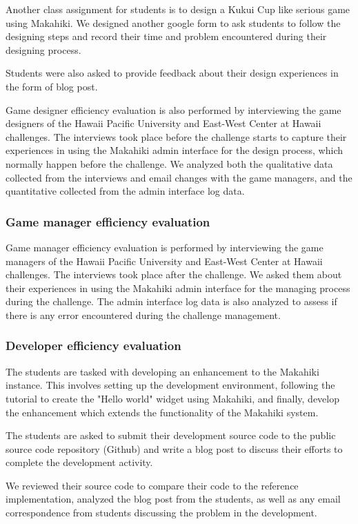 \documentclass{sigchi}
\begin{document}
Another class assignment for students is to design a Kukui Cup like serious game using Makahiki. We designed another google form to ask students to follow the designing steps and record their time and problem encountered during their designing process.

Students were also asked to provide feedback about their design experiences in the form of blog post.

Game designer efficiency evaluation is also performed by interviewing the game designers of the Hawaii Pacific University and East-West Center at Hawaii challenges. The interviews took place before the challenge starts to capture their experiences in using the Makahiki admin interface for the design process, which normally happen before the challenge. We analyzed both the qualitative data collected from the interviews and email changes with the game managers, and the quantitative collected from the admin interface log data.

\subsubsection{Game manager efficiency evaluation}
Game manager efficiency evaluation is performed by interviewing the game managers of the Hawaii Pacific University and East-West Center at Hawaii challenges. The interviews took place after the challenge. We asked them about their experiences in using the Makahiki admin interface for the managing process during the challenge. The admin interface log data is also analyzed to assess if there is any error encountered during the challenge management.

\subsubsection{Developer efficiency evaluation}

The students are tasked with developing an enhancement to the Makahiki instance. This involves setting up the development environment, following the tutorial to create the "Hello world" widget using Makahiki, and finally, develop the enhancement which extends the functionality of the Makahiki system.

The students are asked to submit their development source code to the public source code repository (Github) and write a blog post to discuss their efforts to complete the development activity.

We reviewed their source code to compare their code to the reference implementation, analyzed the blog post from the students, as well as any email correspondence from students discussing the problem in the development.
\end{document}
